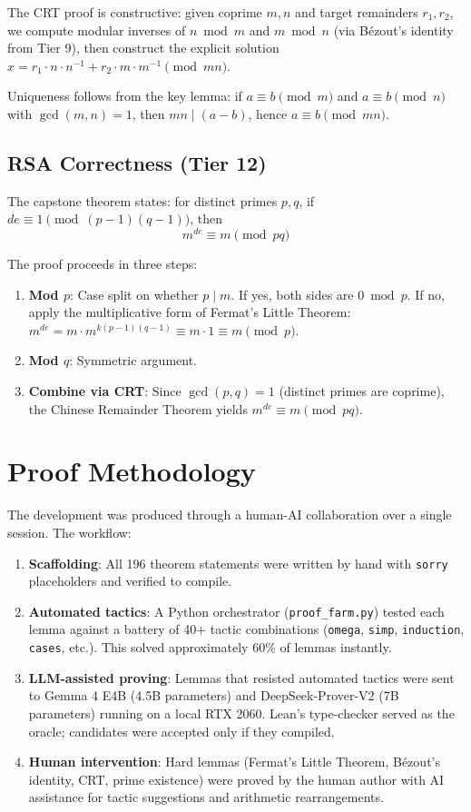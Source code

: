 \documentclass[11pt]{article}
\begin{document}
The CRT proof is constructive: given coprime $m, n$ and target remainders $r_1, r_2$, we compute modular inverses of $n \bmod m$ and $m \bmod n$ (via B\'{e}zout's identity from Tier 9), then construct the explicit solution $x = r_1 \cdot n \cdot n^{-1} + r_2 \cdot m \cdot m^{-1} \pmod{mn}$.

Uniqueness follows from the key lemma: if $a \equiv b \pmod{m}$ and $a \equiv b \pmod{n}$ with $\gcd(m,n) = 1$, then $mn \mid (a - b)$, hence $a \equiv b \pmod{mn}$.

\subsection{RSA Correctness (Tier 12)}

The capstone theorem states: for distinct primes $p, q$, if $de \equiv 1 \pmod{(p-1)(q-1)}$, then
\[
m^{de} \equiv m \pmod{pq}
\]

The proof proceeds in three steps:
\begin{enumerate}
    \item \textbf{Mod $p$}: Case split on whether $p \mid m$. If yes, both sides are $0 \bmod p$. If no, apply the multiplicative form of Fermat's Little Theorem: $m^{de} = m \cdot m^{k(p-1)(q-1)} \equiv m \cdot 1 \equiv m \pmod{p}$.
    \item \textbf{Mod $q$}: Symmetric argument.
    \item \textbf{Combine via CRT}: Since $\gcd(p,q) = 1$ (distinct primes are coprime), the Chinese Remainder Theorem yields $m^{de} \equiv m \pmod{pq}$.
\end{enumerate}

\section{Proof Methodology}

The development was produced through a human-AI collaboration over a single session. The workflow:

\begin{enumerate}[leftmargin=*]
    \item \textbf{Scaffolding}: All 196 theorem statements were written by hand with \texttt{sorry} placeholders and verified to compile.
    \item \textbf{Automated tactics}: A Python orchestrator (\texttt{proof\_farm.py}) tested each lemma against a battery of 40+ tactic combinations (\texttt{omega}, \texttt{simp}, \texttt{induction}, \texttt{cases}, etc.). This solved approximately 60\% of lemmas instantly.
    \item \textbf{LLM-assisted proving}: Lemmas that resisted automated tactics were sent to Gemma 4 E4B (4.5B parameters) and DeepSeek-Prover-V2 (7B parameters) running on a local RTX 2060. Lean's type-checker served as the oracle; candidates were accepted only if they compiled.
    \item \textbf{Human intervention}: Hard lemmas (Fermat's Little Theorem, B\'{e}zout's identity, CRT, prime existence) were proved by the human author with AI assistance for tactic suggestions and arithmetic rearrangements.
\end{enumerate}
\end{document}

